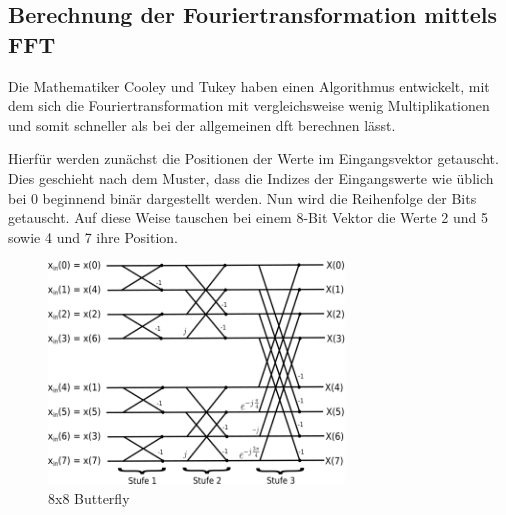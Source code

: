 \subsection{Berechnung der Fouriertransformation mittels FFT}
Die Mathematiker Cooley und Tukey haben einen Algorithmus entwickelt, mit dem sich die Fouriertransformation mit vergleichsweise wenig Multiplikationen
und somit schneller als bei der allgemeinen \gls{dft} berechnen lässt.

Hierfür werden zunächst die Positionen der Werte im Eingangsvektor getauscht. Dies geschieht nach dem Muster, dass die Indizes der Eingangswerte wie
üblich bei 0 beginnend binär dargestellt werden. Nun wird die Reihenfolge der Bits getauscht. Auf diese Weise tauschen bei einem 8-Bit Vektor die
Werte 2 und 5 sowie 4 und 7 ihre Position.


\begin{figure}[htbp]
 \centering
 \includegraphics[width=0.7\textwidth]{img/Butterfly.png}
 \caption{8x8 Butterfly}
 \label{pic:Butterfly}
\end{figure}
